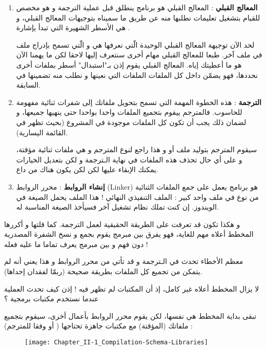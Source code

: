 \begin{enumerate}
  \item \textbf{المعالج القبلي} :
المعالج القبلي هو برنامج ينطلق قبل عملية الترجمة و هو مخصص للقيام بتشغيل تعليمات نطلبها منه عن طريق ما سميناه بتوجيهات المعالج القبلي، و هي الأسطر الشهيرة التي تبدأ يإشارة
\InlineCode{\#}.

لحد الآن توجيهة المعالج القبلي الوحيدة الّتي نعرفها هي
و الّتي تسمح بإدراج ملف في ملف آخر. طبعا للمعالج القبلي مهام أخرى سنتعرف إليها لاحقا لكن ما يهمنا الآن هو ما أعطيتك إياه.
المعالج القبلي يقوم إذن بـ"استبدال" أسطر
بملفات أخرى نحددها، فهو يضمّن داخل كل الملفات
الملفات
التي نعينها و نطلب منه تضمينها في السابقة.
  \item \textbf{الترجمة} : هذه الخطوة المهمة التي تسمح بتحويل ملفاتك إلى شفرات ثنائية مفهومة للحاسوب. فالمترجم ييقوم بتجميع الملفات
واحدا بواحدا حتى ينهيها جميعها، و لضمان ذلك يجب أن تكون كل الملفات موجودة في المشروع (بحيث تظهر في القائمة اليسارية).

سيقوم المترجم بتوليد ملف
أو
و هذا راجع لنوع المترجم و هي ملفات ثنائية مؤقتة، و على أي حال تحذف هذه الملفات في نهاية الـترجمة و لكن بتعديل الخيارات يمكنك الإبقاء عليها لكن لكن يكون هناك من داع.
  \item \textbf{إنشاء الروابط} :
محرر الروابط
(\textenglish{Linker})
هو برنامج يعمل على جمع الملفات الثنائية من نوع
في ملف واحد كبير : الملف التنفيذي النهائي ! هذا الملف يحمل الصيغة
في الويندوز. إن كنت تملك نظام تشغيل آخر فسيأخذ الصيغة المناسبة له.
\end{enumerate}

و هكذا تكون قد تعرفت على الطريقة الحقيقية لعمل الترجمة. كما قلتها و أكررها المخطط أعلاه مهم للغاية، فهو يفرق بين مبرمج يقوم بجمع و نسخ الشفرة المصدرية دون فهم و بين مبرمج يعرف تماما ما عليه فعله !

معظم الأخطاء تحدث في الـترجمة و قد تأتي من محرر الروابط و هذا يعني أنه لم يتمكن من تجميع كل الملفات
بطريقة صحيحة (ربمّا لفقدان إحداها).

لا يزال المخطط أعلاه غير كامل، إذ أن المكتبات لم تظهر فيه ! إذن كيف تحدث العملية عندما نستخدم مكتبات برمجية ؟

تبقى بداية المخطط هي نفسها، لكن يقوم محرر الروابط بأعمال أخرى، سيقوم بتجميع ملفاتك
(المؤقتة) مع مكتبات جاهزة تحتاجها 
(
أو
وفقا للمترجم) :

\begin{figure}[H]
	\centering
	\texttt{[image: Chapter\_II-1\_Compilation-Schema-Libraries]}
\end{figure}

